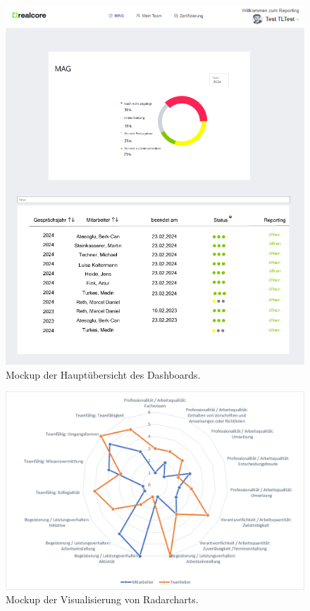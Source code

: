 \begin{figure}[h!]
    \centering
    \includegraphics[width=1.2\textwidth]{images/home.png}
    \caption{Mockup der Hauptübersicht des Dashboards.}
    \label{fig:mockup1}
\end{figure}

\begin{figure}[h!]
    \centering
    \includegraphics[width=1.2\textwidth]{images/radarchart.png}
    \caption{Mockup der Visualisierung von Radarcharts.}
    \label{fig:mockup2}
\end{figure}

